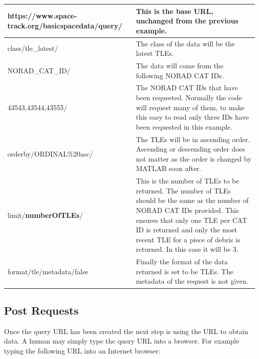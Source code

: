 \documentclass[12pt]{article}
\begin{document}
\begin{table}[H]
\begin{tabular}{|p{6cm}|p{10cm}|}
			https://www.space-track.org/basicspacedata/query/ & This is the base URL, unchanged from the previous example.                                                                                                                                                                                      \\ \hline
			class/tle\_latest/                                & The class of the data will be the latest TLEs.                                                                                                                                                                                                  \\ \hline
			NORAD\_CAT\_ID/                                   & The data will come from the following NORAD CAT IDs.                                                                                                                                                                                            \\ \hline
			43543,43544,43555/                                & The NORAD CAT IDs that have been requested. Normally the code will request many of them, to make this easy to read only three IDs have been requested in this example.                                                                          \\ \hline
			orderby/ORDINAL\%20asc/                           & The TLEs will be in ascending order. Ascending or descending order does not matter as the order is changed by MATLAB soon after.                                                                                                                \\ \hline
			limit/\textbf{numberOfTLEs}/            & This is the number of TLEs to be returned. The number of TLEs should be the same as the number of NORAD CAT IDs provided. This ensures that only one TLE per CAT ID is returned and only the most recent TLE for a piece of debris is returned. In this case it will be 3.\\ \hline
			format/tle/metadata/false                         & Finally the format of the data returned is set to be TLEs. The metadata of the request is not given.                                                                                                                                            \\ \hline
		\end{tabular}
	\end{table}\doublespacing

\subsection{Post Requests}
Once the query URL has been created the next step is using the URL to obtain data. A human may simply type the query URL into a browser. For example typing the following URL into an Internet browser: 
\end{document}
